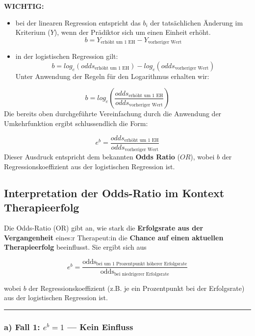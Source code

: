 \documentclass[
]{article}
\begin{document}
\textbf{WICHTIG:}

\begin{itemize}
\item
  bei der linearen Regression entspricht das \(b_i\) der tatsächlichen Änderung im Kriterium (\(Y\)), wenn der Prädiktor sich um einen Einheit erhöht.
  \[b = Y_{\text{erhöht um 1 EH}} - Y_{\text{vorheriger Wert}}\]
\item
  in der logistischen Regression gilt:
  \[b = log_e(odds_{\text{erhöht um 1 EH}}) - log_e(odds_{\text{vorheriger Wert}})\]
  Unter Anwendung der Regeln für den Logarithmus erhalten wir:
\end{itemize}

\[b = log_e\left(\frac{odds_{\text{erhöht um 1 EH}}}{odds_{\text{vorheriger Wert}}}\right)\]
Die bereits oben durchgeführte Vereinfachung durch die Anwendung der Umkehrfunktion ergibt schlussendlich die Form:

\[e^{b} = \frac{odds_{\text{erhöht um 1 EH}}}{odds_{\text{vorheriger Wert}}}\]
Dieser Ausdruck entspricht dem bekannten \textbf{Odds Ratio} (\(OR\)), wobei \(b\) der Regressionskoeffizient aus der logistischen Regression ist.

\subsection{Interpretation der Odds-Ratio im Kontext Therapieerfolg}\label{interpretation-der-odds-ratio-im-kontext-therapieerfolg}

Die Odds-Ratio (OR) gibt an, wie stark die \textbf{Erfolgsrate aus der Vergangenheit} eines:r Therapeut:in die \textbf{Chance auf einen aktuellen Therapieerfolg} beeinflusst. Sie ergibt sich aus

\[e^{b} = \frac{ \text{odds}_{\text{bei um 1 Prozentpunkt höherer Erfolgsrate}} }{ \text{odds}_{\text{bei niedrigerer Erfolgsrate}} }\]

wobei \(b\) der Regressionskoeffizient (z.B. je ein Prozentpunkt bei der Erfolgsrate) aus der logistischen Regression ist.

\begin{center}\rule{0.5\linewidth}{0.5pt}\end{center}

\subsubsection{\texorpdfstring{a) Fall 1: \(e^{b} = 1\) --- Kein Einfluss}{a) Fall 1: e\^{}\{b\} = 1 --- Kein Einfluss}}\label{a-fall-1-eb-1-kein-einfluss}
\end{document}
